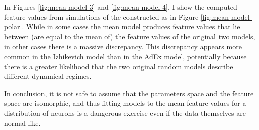 


In Figures \ref{fig:mean-model-3} and \ref{fig:mean-model-4}, I show the computed feature values from simulations of the constructed as in Figure \ref{fig:mean-model-polar}.
While in some cases the mean model produces feature values that lie between (are equal to the mean of) the feature values of the original two models, in other cases there is a massive discrepancy.
This discrepancy appears more common in the Izhikevich model than in the AdEx model, potentially because there is a greater likelihood that the two original random models describe different dynamical regimes.


In conclusion, it is not safe to assume that the parameters space and the feature space are isomorphic, and thus fitting models to the mean feature values for a distribution of neurons is a dangerous exercise even if the data themselves are normal-like.



